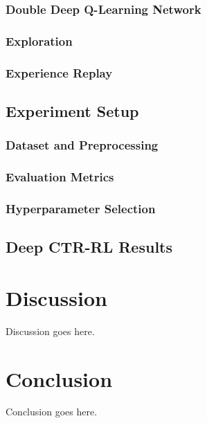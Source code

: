 \documentclass{mldsmsc}
\begin{document}
\subsection{Double Deep Q-Learning Network}

\subsection{Exploration}

\subsection{Experience Replay}

\section{Experiment Setup}

\subsection{Dataset and Preprocessing}

\subsection{Evaluation Metrics}

\subsection{Hyperparameter Selection}

\section{Deep CTR-RL Results}

\chapter{Discussion}
\label{chap:discussion}

Discussion goes here.

\chapter{Conclusion}


Conclusion goes here. 





\clearpage
\renewcommand*{\thepage}{A\arabic{page}}
\end{document}
